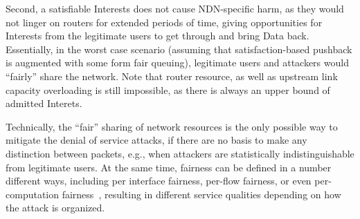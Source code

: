 Second, a satisfiable Interests does not cause NDN-specific harm, as they would not linger on routers for extended periods of time, giving opportunities for Interests from the legitimate users to get through and bring Data back.
Essentially, in the worst case scenario (assuming that satisfaction-based pushback is augmented with some form fair queuing), legitimate users and attackers would ``fairly'' share the network.
Note that router resource, as well as upstream link capacity overloading is still impossible, as there is always an upper bound of admitted Interets.


Technically, the ``fair'' sharing of network resources is the only possible way to mitigate the denial of service attacks, if there are no basis to make any distinction between packets, e.g., when attackers are statistically indistinguishable from legitimate users.
At the same time, fairness can be defined in a number different ways, including per interface fairness, per-flow fairness, or even per-computation fairness~\cite{Capabilities, Portcullis}, resulting in different service qualities depending on how the attack is organized.


